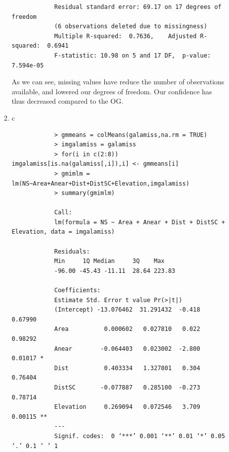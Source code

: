 \documentclass[11pt]{article}
\begin{document}
\begin{enumerate}
\begin{enumerate}
\begin{enumerate}
\begin{verbatim}
			Residual standard error: 69.17 on 17 degrees of freedom
			(6 observations deleted due to missingness)
			Multiple R-squared:  0.7636,	Adjusted R-squared:  0.6941 
			F-statistic: 10.98 on 5 and 17 DF,  p-value: 7.594e-05
		\end{verbatim}
		As we can see, missing values have reduce the number of observations available, and lowered our degrees of freedom. Our confidence has thus decreased compared to the OG.
		\item c
		\begin{verbatim}
			> gmmeans = colMeans(galamiss,na.rm = TRUE)
			> imgalamiss = galamiss
			> for(i in c(2:8)) imgalamiss[is.na(galamiss[,i]),i] <- gmmeans[i]
			> gmimlm = lm(NS~Area+Anear+Dist+DistSC+Elevation,imgalamiss)
			> summary(gmimlm)
			
			Call:
			lm(formula = NS ~ Area + Anear + Dist + DistSC + Elevation, data = imgalamiss)
			
			Residuals:
			Min     1Q Median     3Q    Max 
			-96.00 -45.43 -11.11  28.64 223.83 
			
			Coefficients:
			Estimate Std. Error t value Pr(>|t|)   
			(Intercept) -13.076462  31.291432  -0.418  0.67990   
			Area          0.000602   0.027810   0.022  0.98292   
			Anear        -0.064403   0.023002  -2.800  0.01017 * 
			Dist          0.403334   1.327801   0.304  0.76404   
			DistSC       -0.077887   0.285100  -0.273  0.78714   
			Elevation     0.269094   0.072546   3.709  0.00115 **
			---
			Signif. codes:  0 ‘***’ 0.001 ‘**’ 0.01 ‘*’ 0.05 ‘.’ 0.1 ‘ ’ 1
			

\end{verbatim}
\end{enumerate}
\end{enumerate}
\end{enumerate}
\end{document}
